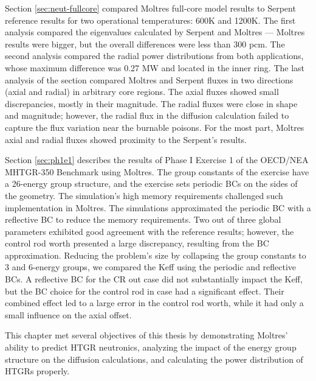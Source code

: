 Section \ref{sec:neut-fullcore} compared Moltres full-core model results to Serpent reference results for two operational temperatures: 600K and 1200K.
The first analysis compared the eigenvalues calculated by Serpent and Moltres --- Moltres results were bigger, but the overall differences were less than 300 pcm.
The second analysis compared the radial power distributions from both applications, whose maximum difference was 0.27 MW and located in the inner ring.
The last analysis of the section compared Moltres and Serpent fluxes in two directions (axial and radial) in arbitrary core regions.
The axial fluxes showed small discrepancies, mostly in their magnitude.
The radial fluxes were close in shape and magnitude; however, the radial flux in the diffusion calculation failed to capture the flux variation near the burnable poisons.
For the most part, Moltres axial and radial fluxes showed proximity to the Serpent’s results.

Section \ref{sec:ph1e1} describes the results of Phase I Exercise 1 of the OECD/NEA MHTGR-350 Benchmark using Moltres.
The group constants of the exercise have a 26-energy group structure, and the exercise sets periodic \glspl{BC} on the sides of the geometry.
The simulation's high memory requirements challenged such implementation in Moltres.
The simulations approximated the periodic BC with a reflective BC to reduce the memory requirements.
Two out of three global parameters exhibited good agreement with the reference results; however, the control rod worth presented a large discrepancy, resulting from the BC approximation.
Reducing the problem's size by collapsing the group constants to 3 and 6-energy groups, we compared the \gls{Keff} using the periodic and reflective BCs.
A reflective BC for the \gls{CR} out case did not substantially impact the \gls{Keff}, but the BC choice for the control rod in case had a significant effect.
Their combined effect led to a large error in the control rod worth, while it had only a small influence on the axial offset.

This chapter met several objectives of this thesis by demonstrating Moltres' ability to predict HTGR neutronics, analyzing the impact of the energy group structure on the diffusion calculations, and calculating the power distribution of HTGRs properly.
